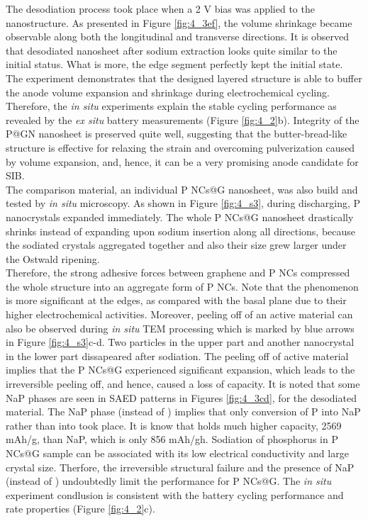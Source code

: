 The desodiation process took place when a 2 V bias was applied to the nanostructure. As presented in Figure \ref{fig:4_3ef}, the volume shrinkage became observable along both the longitudinal and transverse directions. 
It is observed that desodiated nanosheet after sodium extraction looks quite similar to the initial status. What is more, the edge segment perfectly kept the initial state. 
The experiment demonstrates that the designed layered structure is able to buffer the anode volume expansion and shrinkage during electrochemical cycling. 
Therefore, the {\em in situ} experiments explain the stable cycling performance as revealed by the {\em ex situ} battery measurements (Figure \ref{fig:4_2}b). 
Integrity of the P@GN nanosheet is preserved quite well, suggesting that the butter-bread-like structure is effective for relaxing the strain and overcoming pulverization caused by volume expansion, and, hence, it can be a very promising anode candidate for SIB.\\

The comparison material, an individual P NCs@G nanosheet, was also build and tested by {\em in situ} microscopy. 
As shown in Figure \ref{fig:4_s3}, during discharging, P nanocrystals expanded immediately. 
The whole P NCs@G nanosheet drastically shrinks instead of expanding upon sodium insertion along all directions, because the sodiated crystals aggregated together and also their size grew larger under the Ostwald ripening. \\

Therefore, the strong adhesive forces between graphene and P NCs compressed the whole structure into an aggregate form of P NCs. 
Note that the phenomenon is more significant at the edges, as compared with the basal plane due to their higher electrochemical activities. 
Moreover, peeling off of an active material can also be observed during {\em in situ} TEM processing which is marked by blue arrows in Figure \ref{fig:4_s3}c-d. Two particles in the upper part and another nanocrystal in the lower part dissapeared after sodiation. 
The peeling off of active material implies that the P NCs@G experienced significant expansion, which leads to the irreversible peeling off, and hence, caused a loss of capacity. 
It is noted that some NaP phases are seen in SAED patterns in Figures \ref{fig:4_3cd}, for the desodiated material. The NaP phase (instead of ) implies that only conversion of P into NaP rather than into  took place. It is know that  holds much higher capacity, 2569 mAh/g, than NaP, which is only 856 mAh/gh. 
Sodiation of phosphorus in P NCs@G sample can be associated with its low electrical conductivity and large crystal size. 
Therfore, the irreversible structural failure and the presence of NaP (instead of ) undoubtedly limit the performance for P NCs@G. 
The {\it in situ} experiment condlusion is consistent with the battery cycling performance and rate properties (Figure \ref{fig:4_2}c). \\

